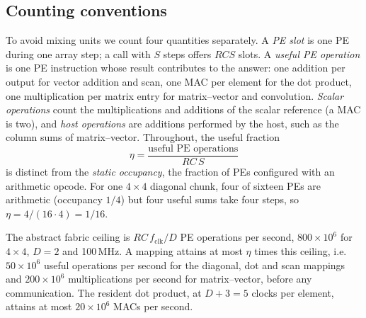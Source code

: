 \subsection{Counting conventions}
\label{sec:conventions}

To avoid mixing units we count four quantities separately. A \emph{PE slot}
is one PE during one array step; a call with $S$ steps offers $RCS$ slots.
A \emph{useful PE operation} is one PE instruction whose result contributes
to the answer: one addition per output for vector addition and scan, one
MAC per element for the dot product, one multiplication per matrix entry
for matrix--vector and convolution. \emph{Scalar operations} count the
multiplications and additions of the scalar reference (a MAC is two), and
\emph{host operations} are additions performed by the host, such as the
column sums of matrix--vector. Throughout, the useful fraction
\begin{equation}
  \eta=\frac{\text{useful PE operations}}{RC\,S}
  \label{eq:eta}
\end{equation}
is distinct from the \emph{static occupancy}, the fraction of PEs
configured with an arithmetic opcode. For one $4\times4$ diagonal chunk,
four of sixteen PEs are arithmetic (occupancy $1/4$) but four useful sums
take four steps, so $\eta=4/(16\cdot4)=1/16$.

The abstract fabric ceiling is $RC\,f_{\mathrm{clk}}/D$ PE operations per
second, $800\times10^{6}$ for $4\times4$, $D=2$ and 100\,MHz. A mapping
attains at most $\eta$ times this ceiling, i.e.\ $50\times10^{6}$ useful
operations per second for the diagonal, dot and scan mappings and
$200\times10^{6}$ multiplications per second for matrix--vector, before any
communication. The resident dot product, at $D+3=5$ clocks per element,
attains at most $20\times10^{6}$ MACs per second.
